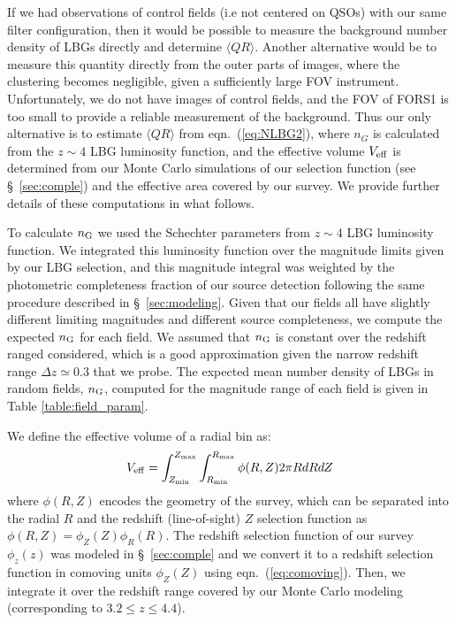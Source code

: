 \documentclass[iop, revtex4]{emulateapj}
\begin{document}
If we had observations of control fields (i.e not centered on QSOs)
with our same filter configuration, then it would be possible to
measure the background number density of LBGs directly and determine
$\langle QR\rangle$. Another alternative would be to measure this
quantity directly from the outer parts of images, where the clustering
becomes negligible, given a sufficiently large FOV instrument.
Unfortunately, we do not have images of control fields, and the
FOV of FORS1 is too small to provide a reliable measurement of the
background. Thus our only alternative is to estimate $\langle
QR\rangle$ from eqn.~(\ref{eq:NLBG2}), where $n_G$ is calculated from
the $z\sim 4$ LBG luminosity function, and the effective volume
$V_{\rm eff}$ is determined from our Monte Carlo simulations of our
selection function (see \S~\ref{sec:comple}) and the effective area
covered by our survey. We provide further details of these
computations in what follows.

To calculate $n_{\rm G}$ we used the Schechter parameters from
\citet{Ouchi04a} $z\sim 4$ LBG luminosity function. We integrated
this luminosity function over the magnitude limits given by our LBG selection, and this magnitude integral was
weighted by the photometric completeness fraction of our source detection following the same
procedure described in \S~\ref{sec:modeling}.
Given that our fields all have slightly different limiting magnitudes
and different source completeness, we compute the expected $n_{\rm G}$ for
each field. We assumed that $n_{\rm G}$ is constant over the redshift
ranged considered, which is a good approximation given the narrow
redshift range $\Delta z \simeq 0.3$ that we probe. The expected mean
number density of LBGs in random fields, $n_{\rm G}$, computed for the
magnitude range of each field is given in Table
\ref{table:field_param}.

We define the effective volume of a radial bin as:
\begin{equation} \label{eq:veff}
V_{\rm eff} =  \int_{Z_{\rm min}}^{Z_{\rm max}} \int_{R_{\rm min}}^{R_{\rm max}} \phi(R,Z) 2\pi R dR dZ 
\end{equation}
where $\phi(R,Z)$ encodes the geometry of the survey, which can be separated into the radial $R$
and the redshift (line-of-sight) $Z$ selection function as $\phi(R,Z)=\phi_{Z}(Z)\phi_{R}(R)$.
The redshift selection function of our survey $\phi_{z}(z)$ was modeled in \S~\ref{sec:comple}
and we convert it to a redshift selection function in comoving units $\phi_{Z}(Z)$ using eqn.~(\ref{eq:comoving}). Then, we integrate it over the redshift range covered by our Monte Carlo modeling (corresponding to $3.2 \leq z \leq 4.4$). 
\end{document}
